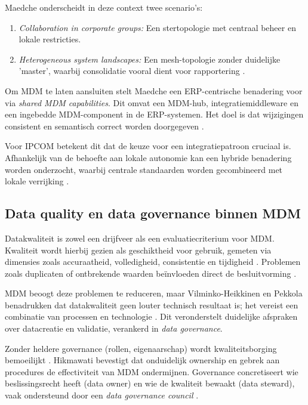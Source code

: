Maedche onderscheidt in deze context twee scenario's:
\begin{enumerate}
    \item \emph{Collaboration in corporate groups:} Een stertopologie met centraal beheer en lokale restricties.
    \item \emph{Heterogeneous system landscapes:} Een mesh-topologie zonder duidelijke 'master', waarbij consolidatie vooral dient voor rapportering \autocite{Maedche2010}.
\end{enumerate}

Om MDM te laten aansluiten stelt Maedche een ERP-centrische benadering voor via \emph{shared MDM capabilities}. Dit omvat een MDM-hub, integratiemiddleware en een ingebedde MDM-component in de ERP-systemen. Het doel is dat wijzigingen consistent en semantisch correct worden doorgegeven \autocite{Maedche2010}.

Voor IPCOM betekent dit dat de keuze voor een integratiepatroon cruciaal is. Afhankelijk van de behoefte aan lokale autonomie kan een hybride benadering worden onderzocht, waarbij centrale standaarden worden gecombineerd met lokale verrijking \autocite{Maedche2010}.

\subsection{Data quality en data governance binnen MDM}
Datakwaliteit is zowel een drijfveer als een evaluatiecriterium voor MDM. Kwaliteit wordt hierbij gezien als geschiktheid voor gebruik, gemeten via dimensies zoals accuraatheid, volledigheid, consistentie en tijdigheid \autocite{Hikmawati}. Problemen zoals duplicaten of ontbrekende waarden beïnvloeden direct de besluitvorming \autocite{Hikmawati}.

MDM beoogt deze problemen te reduceren, maar Vilminko-Heikkinen en Pekkola benadrukken dat datakwaliteit geen louter technisch resultaat is; het vereist een combinatie van processen en technologie \autocite{VilminkoHeikkinenPekkola2019}. Dit veronderstelt duidelijke afspraken over datacreatie en validatie, verankerd in \emph{data governance}.

Zonder heldere governance (rollen, eigenaarschap) wordt kwaliteitsborging bemoeilijkt \autocite{VilminkoHeikkinenPekkola2019}. Hikmawati bevestigt dat onduidelijk ownership en gebrek aan procedures de effectiviteit van MDM ondermijnen. Governance concretiseert wie beslissingsrecht heeft (data owner) en wie de kwaliteit bewaakt (data steward), vaak ondersteund door een \emph{data governance council} \autocite{Hikmawati}.

